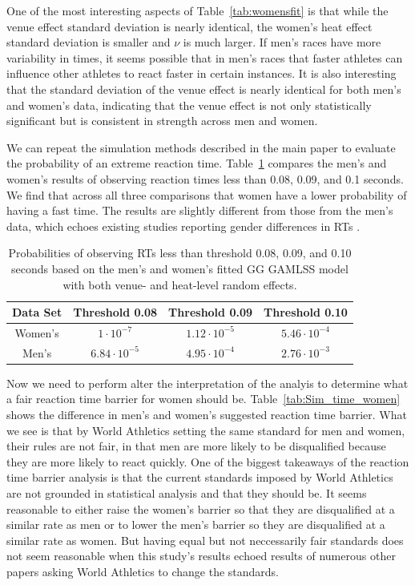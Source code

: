 \documentclass[12pt, letterpaper]{article}
\begin{document}
One of the most interesting aspects of Table~\ref{tab:womensfit} is that while
the venue effect standard deviation is nearly identical, the women's heat effect
standard deviation is smaller and $\nu$ is much larger.  If men's races have
more variability in times, it seems possible that in men's races that faster
athletes can influence other athletes to react faster in certain instances.
It is also interesting that the standard deviation of the venue effect is
nearly identical for both men's and women's data, indicating that the venue
effect is not only statistically significant but is consistent in strength
across men and women.

We can repeat the simulation methods described in the main paper to evaluate
the probability of an extreme reaction time.  Table~\ref{tab:Sim_prob_women}
compares the men's and women's results of observing reaction times less than
0.08, 0.09, and 0.1 seconds.  We find that across all three comparisons that
women have a lower probability of having a fast time. The results are slightly
different from those from the men's data, which echoes existing studies
reporting gender differences in RTs \citep[e.g.,][]{lipps2011implications,
babicc2009reaction, panoutsakopoulos2020gender}.

\begin{table}
  \centering
  \caption{Probabilities of observing RTs less than threshold 0.08,
  0.09, and 0.10 seconds based on the men's and women's
    fitted GG GAMLSS model with both venue- and heat-level
random effects.}
  \begin{tabular}{c c c c}
   \toprule
   Data Set & Threshold 0.08 & Threshold 0.09 & Threshold 0.10  \\
   \midrule
   Women's & $1\cdot10^{-7}$ & $1.12\cdot10^{-5}$ &  $5.46\cdot10^{-4}$  \\
   Men's   & $6.84\cdot10^{-5}$ & $4.95\cdot10^{-4}$ & $2.76\cdot10^{-3}$ \\
   \bottomrule
  \end{tabular}
  \label{tab:Sim_prob_women}
\end{table}


Now we need to perform alter the interpretation of the analyis to determine
what a fair reaction time barrier for women should be.
Table~\ref{tab:Sim_time_women} shows the difference in men's and women's
suggested reaction time barrier.  What we see is that by World Athletics setting
the same standard for men and women, their rules are not fair, in that men are
more likely to be disqualified because they are more likely to react quickly.
One of the biggest takeaways of the reaction time barrier analysis is that the
current standards imposed by World Athletics are not grounded in statistical
analysis and that they should be.  It seems reasonable to either raise the
women's barrier so that they are disqualified at a similar rate as men or to
lower the men's barrier so they are disqualified at a similar rate as women.  But
having equal but not neccessarily fair standards does not seem reasonable when
this study's results echoed results of numerous other papers asking World
Athletics to change the standards.
\end{document}
